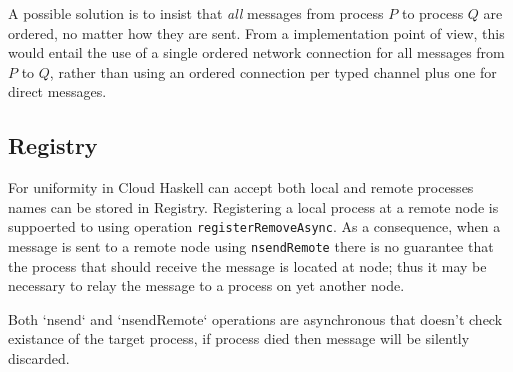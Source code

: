 \documentclass{article}
\begin{document}
A possible solution is to insist that \emph{all} messages from process $P$ to
process $Q$ are ordered, no matter how they are sent. From a implementation
point of view, this would entail the use of a single ordered network connection
for all messages from $P$ to $Q$, rather than using an ordered connection per
typed channel plus one for direct messages.

\subsection{Registry}

For uniformity in Cloud Haskell can accept both local and remote processes
names can be stored in Registry. Registering a local process at a remote
node is suppoerted to using operation \texttt{registerRemoveAsync}.
As a consequence, when a message is sent to a remote node using \texttt{nsendRemote}
there is no guarantee that the process that should receive the message is
located at node; thus it may be necessary to relay the message to a process
on yet another node.

Both `nsend` and `nsendRemote` operations are asynchronous that doesn't
check existance of the target process, if process died then message will
be silently discarded.




\end{document}
